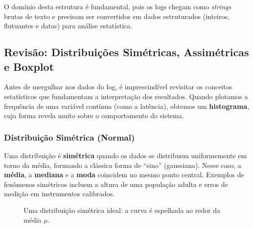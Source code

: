 \documentclass[12pt,a4paper]{report}
\begin{document}
O domínio desta estrutura é fundamental, pois os logs chegam como \textit{strings} brutas de texto e precisam ser convertidos em dados estruturados (inteiros, flutuantes e datas) para análise estatística.

\subsection{Revisão: Distribuições Simétricas, Assimétricas e Boxplot}

Antes de mergulhar nos dados do log, é imprescindível revisitar os conceitos estatísticos que fundamentam a interpretação dos resultados. Quando plotamos a frequência de uma variável contínua (como a latência), obtemos um \textbf{histograma}, cuja forma revela muito sobre o comportamento do sistema.

\subsubsection{Distribuição Simétrica (Normal)}

Uma distribuição é \textbf{simétrica} quando os dados se distribuem uniformemente em torno da média, formando a clássica forma de ``sino'' (gaussiana). Nesse caso, a \textbf{média}, a \textbf{mediana} e a \textbf{moda} coincidem no mesmo ponto central. Exemplos de fenômenos simétricos incluem a altura de uma população adulta e erros de medição em instrumentos calibrados.

\begin{figure}[h]
    \centering
    \caption{Uma distribuição simétrica ideal: a curva é espelhada ao redor da média $\mu$.}
\end{figure}
\end{document}
